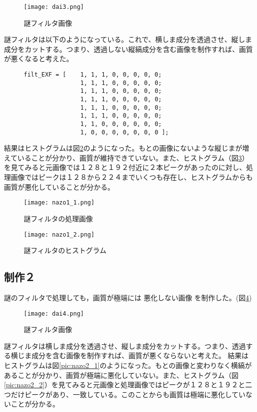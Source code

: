 \documentclass[a4j]{jsarticle}
\begin{document}
\begin{figure}[H]
  \centering
  \texttt{[image: dai3.png]}
  \caption{謎フィルタ画像}
  \label{pic:nazo1}
\end{figure}
謎フィルタは以下のようになっている。これで、横しま成分を透過させ、縦しま成分をカットする。つまり、透過しない縦縞成分を含む画像を制作すれば、画質が悪くなると考えた。
\begin{figure}
  \begin{verbatim}
filt_EXF = [    1, 1, 1, 0, 0, 0, 0, 0;
                1, 1, 1, 0, 0, 0, 0, 0;
                1, 1, 1, 0, 0, 0, 0, 0;
                1, 1, 1, 0, 0, 0, 0, 0;
                1, 1, 1, 0, 0, 0, 0, 0;
                1, 1, 1, 0, 0, 0, 0, 0;
                1, 1, 0, 0, 0, 0, 0, 0;
                1, 0, 0, 0, 0, 0, 0, 0 ];
  \end{verbatim}
\end{figure}
結果はヒストグラムは図\ref{pic:nazo1_1}のようになった。もとの画像にないような縦じまが増えていることが分かり、画質が維持できていない。また、ヒストグラム（図\ref{pic:nazo1_2}）を見てみると元画像では１２８と１９２付近に２本ピークがあったのに対し、処理画像ではピークは１２８から２２４までいくつも存在し、ヒストグラムからも画質が悪化していることが分かる。
\begin{figure}[H]
  \centering
  \texttt{[image: nazo1\_1.png]}
  \caption{謎フィルタの処理画像}
  \label{pic:nazo1_1}
\end{figure}
\begin{figure}[H]
  \centering
  \texttt{[image: nazo1\_2.png]}
  \caption{謎フィルタのヒストグラム}
  \label{pic:nazo1_2}
\end{figure}

\subsection{制作２}
謎のフィルタで処理しても，画質が極端には
悪化しない画像 を制作した。(図\ref{pic:nazo2})

\begin{figure}[H]
  \centering
  \texttt{[image: dai4.png]}
  \caption{謎フィルタ画像}
  \label{pic:nazo2}
\end{figure}
謎フィルタは横しま成分を透過させ、縦しま成分をカットする。つまり、透過する横じま成分を含む画像を制作すれば、画質が悪くならないと考えた。
結果はヒストグラムは図\ref{pic:nazo2_1}のようになった。もとの画像と変わりなく横縞があることが分かり、画質が極端に悪化していない。また、ヒストグラム（図\ref{pic:nazo2_2}）を見てみると元画像と処理画像ではピークが１２８と１９２と二つだけピークがあり、一致している。このことからも画質は極端に悪化していないことが分かる。
\end{document}
